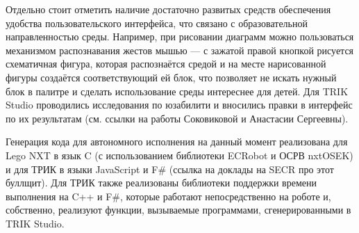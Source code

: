 ﻿\documentclass[conference]{IEEEtran}
\begin{document}
Отдельно стоит отметить наличие достаточно развитых средств обеспечения удобства пользовательского 
интерфейса, что связано с образовательной направленностью среды. Например, при рисовании 
диаграмм можно пользоваться механизмом распознавания жестов мышью --- с зажатой правой 
кнопкой рисуется схематичная фигура, которая распознаётся средой и на месте нарисованной 
фигуры создаётся соответствующий ей блок, что позволяет не искать нужный блок в палитре 
и сделать использование среды интереснее для детей. Для TRIK Studio проводились исследования 
по юзабилити и вносились правки в интерфейс по их результатам (см. ссылки на работы Соковиковой и Анастасии Сергеевны).

Генерация кода для автономного исполнения на данный момент реализована для Lego NXT 
в язык C (с использованием библиотеки ECRobot и ОСРВ nxtOSEK) и для ТРИК в языки JavaScript и F\# 
(ссылка на доклады на SECR про этот буллщит). Для ТРИК также реализованы библиотеки 
поддержки времени выполнения на C++ и F\#, которые работают непосредственно на роботе 
и, собственно, реализуют функции, вызываемые программами, сгенерированными в TRIK Studio.
\end{document}
